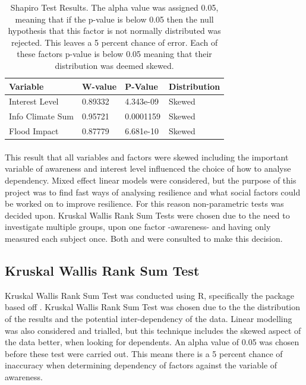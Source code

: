 \begin{table}[h!]
    \centering
    \begin{tabular}{|l|l|l|l|}
    \hline
         Variable & W-value & P-Value & Distribution \\ \hline
       Interest Level & 0.89332 & 4.343e-09 & Skewed \\ \hline
         Info Climate Sum  & 0.95721 & 0.0001159 & Skewed \\ \hline
        Flood Impact & 0.87779 & 6.681e-10 & Skewed \\ \hline
     \end{tabular}
    \caption{Shapiro Test Results. The alpha value was assigned 0.05, meaning that if the p-value is below 0.05 then the null hypothesis that this factor is not normally distributed was rejected. This leaves a 5 percent chance of error. Each of these factors p-value is below 0.05 meaning that their distribution was deemed skewed.}
    \label{table:shapiro_test_results}
\end{table}
\paragraph{}

This result that all variables and factors were skewed including the important variable of awareness and interest level influenced the choice of how to analyse dependency. Mixed effect linear models were considered, but the purpose of this project was to find fast ways of analysing resilience and what social factors could be worked on to improve resilience. For this reason non-parametric tests was decided upon. Kruskal Wallis Rank Sum Tests were chosen due to the need to investigate multiple groups, upon one factor -awareness- and having only measured each subject once. Both \cite{tasman_how_2014} and \cite{hollander_nonparametric_2014} were consulted to make this decision. 

\subsection{Kruskal Wallis Rank Sum Test}
Kruskal Wallis Rank Sum Test was conducted using R, specifically the package based off \cite{hollander_nonparametric_2014}. Kruskal Wallis Rank Sum Test was chosen due to the the distribution of the results and the potential inter-dependency of the data. Linear modelling was also considered and trialled, but this technique includes the skewed aspect of the data better, when looking for dependents. An alpha value of 0.05 was chosen before these test were carried out. This means there is a 5 percent chance of inaccuracy when determining dependency of factors against the variable of awareness.

